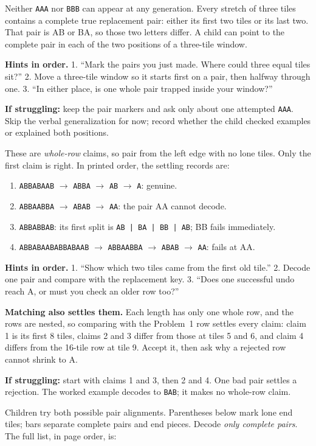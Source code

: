 \documentclass[11pt,letterpaper]{article}
\newcommand{\head}[1]{\par\vspace{5pt}{\large\bfseries #1}\par\nopagebreak\vspace{1pt}}
\newcommand{\problem}[2]{\par\vspace{5pt}{\bfseries Problem #1\quad #2}\par\nopagebreak}
\newcommand{\word}[1]{\texttt{#1}}
\newcommand{\hint}[1]{\textbf{Hints in order.} #1}
\begin{document}
\problem{2}{Core, student page 1}
Neither \word{AAA} nor \word{BBB} can appear at any generation. Every stretch of three tiles contains a complete true replacement pair: either its first two tiles or its last two. That pair is AB or BA, so those two letters differ. A child can point to the complete pair in each of the two positions of a three-tile window.

\hint{1. ``Mark the pairs you just made. Where could three equal tiles sit?'' 2. Move a three-tile window so it starts first on a pair, then halfway through one. 3. ``In either place, is one whole pair trapped inside your window?''}

\textbf{If struggling:} keep the pair markers and ask only about one attempted \word{AAA}. Skip the verbal generalization for now; record whether the child checked examples or explained both positions.

\problem{3}{Core, student page 2}
These are \emph{whole-row} claims, so pair from the left edge with no lone tiles. Only the first claim is right. In printed order, the settling records are:
\begin{enumerate}
\item \word{ABBABAAB} $\to$ \word{ABBA} $\to$ \word{AB} $\to$ \word{A}: genuine.
\item \word{ABBAABBA} $\to$ \word{ABAB} $\to$ \word{AA}: the pair AA cannot decode.
\item \word{ABBABBAB}: its first split is \word{AB | BA | BB | AB}; BB fails immediately.
\item \word{ABBABAABABBABAAB} $\to$ \word{ABBAABBA} $\to$ \word{ABAB} $\to$ \word{AA}: fails at AA.
\end{enumerate}
\hint{1. ``Show which two tiles came from the first old tile.'' 2. Decode one pair and compare with the replacement key. 3. ``Does one successful undo reach A, or must you check an older row too?''}

\textbf{Matching also settles them.} Each length has only one whole row, and the rows are nested, so comparing with the Problem~1 row settles every claim: claim 1 is its first 8 tiles, claims 2 and 3 differ from those at tiles 5 and 6, and claim 4 differs from the 16-tile row at tile 9. Accept it, then ask why a rejected row cannot shrink to A.

\textbf{If struggling:} start with claims 1 and 3, then 2 and 4. One bad pair settles a rejection. The worked example decodes to \word{BAB}; it makes no whole-row claim.

\head{Hidden seams and forged strips}
\problem{4}{Core, student page 3}
Children try both possible pair alignments. Parentheses below mark lone end tiles; bars separate complete pairs and end pieces. Decode \emph{only complete pairs}. The full list, in page order, is:
\end{document}
